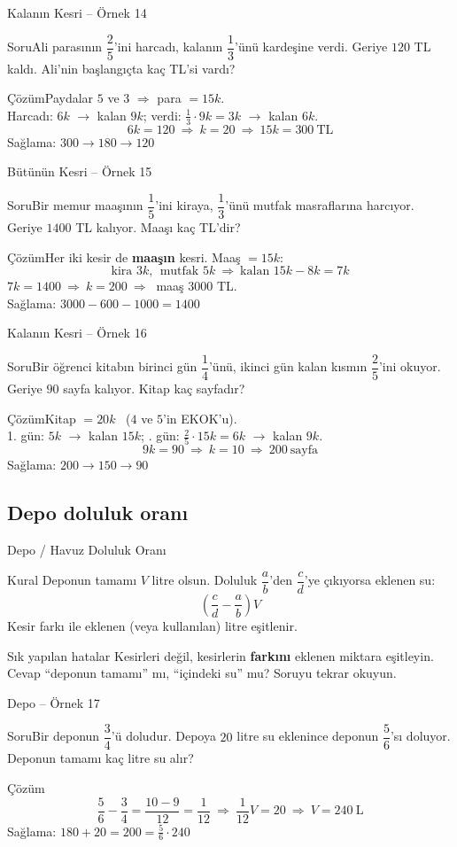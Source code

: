 \documentclass[aspectratio=169,11pt]{beamer}
\newcommand{\soru}[3]{%
\begin{frame}{#1}
  \begin{block}{Soru}\large #2\end{block}
  \pause
  \begin{exampleblock}{Çözüm}\large #3\end{exampleblock}
\end{frame}}
\begin{document}
\soru{Kalanın Kesri -- Örnek 14}
{Ali parasının \(\dfrac{2}{5}\)'ini harcadı, kalanın \(\dfrac{1}{3}\)'ünü kardeşine verdi. Geriye \(120\) TL kaldı. Ali'nin başlangıçta kaç TL'si vardı?}
{Paydalar \(5\) ve \(3\) \(\Rightarrow\) para \(=15k\).\\[2pt]
Harcadı: \(6k\) \(\to\) kalan \(9k\); \quad verdi: \(\frac{1}{3}\cdot 9k=3k\) \(\to\) kalan \(6k\).
\[6k=120\ \Rightarrow\ k=20\ \Rightarrow\ 15k=300\ \text{TL}\]
Sağlama: \(300\to 180\to 120\) \checkmark}

\soru{Bütünün Kesri -- Örnek 15}
{Bir memur maaşının \(\dfrac{1}{5}\)'ini kiraya, \(\dfrac{1}{3}\)'ünü mutfak masraflarına harcıyor. Geriye \(1400\) TL kalıyor. Maaşı kaç TL'dir?}
{Her iki kesir de \textbf{maaşın} kesri. Maaş \(=15k\):
\[\text{kira } 3k,\ \ \text{mutfak } 5k\ \Rightarrow\ \text{kalan } 15k-8k=7k\]
\(7k=1400\ \Rightarrow\ k=200\ \Rightarrow\ \) maaş \(3000\) TL.\\[3pt]
Sağlama: \(3000-600-1000=1400\) \checkmark}

\soru{Kalanın Kesri -- Örnek 16}
{Bir öğrenci kitabın birinci gün \(\dfrac{1}{4}\)'ünü, ikinci gün kalan kısmın \(\dfrac{2}{5}\)'ini okuyor. Geriye \(90\) sayfa kalıyor. Kitap kaç sayfadır?}
{Kitap \(=20k\) \ (\(4\) ve \(5\)'in EKOK'u).\\[2pt]
1. gün: \(5k\) \(\to\) kalan \(15k\); \quad 2. gün: \(\frac{2}{5}\cdot 15k=6k\) \(\to\) kalan \(9k\).
\[9k=90\ \Rightarrow\ k=10\ \Rightarrow\ 200\ \text{sayfa}\]
Sağlama: \(200\to 150\to 90\) \checkmark}

\subsection{Depo doluluk oranı}
\begin{frame}{Depo / Havuz Doluluk Oranı}
\begin{block}{Kural}
Deponun tamamı \(V\) litre olsun. Doluluk \(\dfrac{a}{b}\)'den \(\dfrac{c}{d}\)'ye çıkıyorsa eklenen su:
\[\left(\frac{c}{d}-\frac{a}{b}\right)V\]
Kesir farkı ile eklenen (veya kullanılan) litre eşitlenir.
\end{block}
\begin{alertblock}{Sık yapılan hatalar}
Kesirleri değil, kesirlerin \textbf{farkını} eklenen miktara eşitleyin. Cevap ``deponun tamamı'' mı, ``içindeki su'' mu? Soruyu tekrar okuyun.
\end{alertblock}
\end{frame}

\soru{Depo -- Örnek 17}
{Bir deponun \(\dfrac{3}{4}\)'ü doludur. Depoya \(20\) litre su eklenince deponun \(\dfrac{5}{6}\)'sı doluyor. Deponun tamamı kaç litre su alır?}
{\[\frac{5}{6}-\frac{3}{4}=\frac{10-9}{12}=\frac{1}{12}\ \Rightarrow\ \frac{1}{12}V=20\ \Rightarrow\ V=240\ \text{L}\]
Sağlama: \(180+20=200=\frac{5}{6}\cdot 240\) \checkmark}
\end{document}
